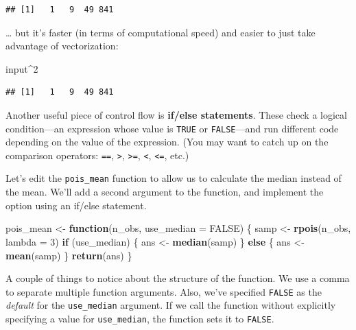 \documentclass[
  12pt,
  oneside,openany]{book}
\newenvironment{Shaded}{\begin{snugshade}}{\end{snugshade}}
\newcommand{\ControlFlowTok}[1]{\textcolor[rgb]{0.13,0.29,0.53}{\textbf{#1}}}
\newcommand{\DataTypeTok}[1]{\textcolor[rgb]{0.13,0.29,0.53}{#1}}
\newcommand{\DecValTok}[1]{\textcolor[rgb]{0.00,0.00,0.81}{#1}}
\newcommand{\KeywordTok}[1]{\textcolor[rgb]{0.13,0.29,0.53}{\textbf{#1}}}
\newcommand{\NormalTok}[1]{#1}
\newcommand{\OperatorTok}[1]{\textcolor[rgb]{0.81,0.36,0.00}{\textbf{#1}}}
\newcommand{\OtherTok}[1]{\textcolor[rgb]{0.56,0.35,0.01}{#1}}
\newcommand{\StringTok}[1]{\textcolor[rgb]{0.31,0.60,0.02}{#1}}
\begin{document}
\begin{verbatim}
## [1]   1   9  49 841
\end{verbatim}

\ldots{} but it's faster (in terms of computational speed) and easier to just take advantage of vectorization:

\begin{Shaded}
\begin{Highlighting}[]
\NormalTok{input}\OperatorTok{\^{}}\DecValTok{2}
\end{Highlighting}
\end{Shaded}

\begin{verbatim}
## [1]   1   9  49 841
\end{verbatim}

Another useful piece of control flow is \textbf{if/else statements}. These check a logical condition---an expression whose value is \texttt{TRUE} or \texttt{FALSE}---and run different code depending on the value of the expression. (You may want to catch up on the comparison operators: \texttt{==}, \texttt{\textgreater{}}, \texttt{\textgreater{}=}, \texttt{\textless{}}, \texttt{\textless{}=}, etc.)

Let's edit the \texttt{pois\_mean} function to allow us to calculate the median instead of the mean. We'll add a second argument to the function, and implement the option using an if/else statement.

\begin{Shaded}
\begin{Highlighting}[]
\NormalTok{pois\_mean <{-}}\StringTok{ }\ControlFlowTok{function}\NormalTok{(n\_obs, }\DataTypeTok{use\_median =} \OtherTok{FALSE}\NormalTok{) \{}
\NormalTok{  samp <{-}}\StringTok{ }\KeywordTok{rpois}\NormalTok{(n\_obs, }\DataTypeTok{lambda =} \DecValTok{3}\NormalTok{)}
  \ControlFlowTok{if}\NormalTok{ (use\_median) \{}
\NormalTok{    ans <{-}}\StringTok{ }\KeywordTok{median}\NormalTok{(samp)}
\NormalTok{  \} }\ControlFlowTok{else}\NormalTok{ \{}
\NormalTok{    ans <{-}}\StringTok{ }\KeywordTok{mean}\NormalTok{(samp)}
\NormalTok{  \}}
  \KeywordTok{return}\NormalTok{(ans)}
\NormalTok{\}}
\end{Highlighting}
\end{Shaded}

A couple of things to notice about the structure of the function. We use a comma to separate multiple function arguments. Also, we've specified \texttt{FALSE} as the \emph{default} for the \texttt{use\_median} argument. If we call the function without explicitly specifying a value for \texttt{use\_median}, the function sets it to \texttt{FALSE}.
\end{document}
